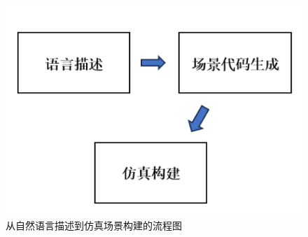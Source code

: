 \begin{figure}[H]
	\centering
	\includegraphics[width=1.0\textwidth]{"images/流程图1.pdf"}
	\caption{从自然语言描述到仿真场景构建的流程图}
	\label{fig:flowchart}
\end{figure}